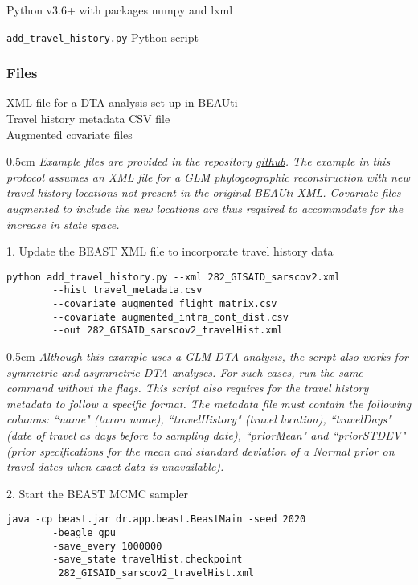 \documentclass{article}
\newcommand{\ann}[1]{
\begin{adjustwidth}{0.5cm}{}
\it{#1}\\
\end{adjustwidth}}
\newcommand{\code}[1]{
{\upshape\ttfamily{#1}}}
\begin{document}
\hspace{0.5cm}Python v3.6+ with packages numpy and lxml

\hspace{0.5cm}\verb|add_travel_history.py| Python script

\subsubsection*{Files}
XML file for a DTA analysis set up in BEAUti \\
Travel history metadata CSV file \\
Augmented covariate files \\

\ann{Example files are provided in the repository {\upshape\url{github}}. The example in this protocol assumes an XML file for a GLM phylogeographic reconstruction with new travel history locations not present in the original BEAUti XML. Covariate files augmented to include the new locations are thus required to accommodate for the increase in state space.}

1. Update the BEAST XML file to incorporate travel history data
\begin{verbatim}
python add_travel_history.py --xml 282_GISAID_sarscov2.xml
        --hist travel_metadata.csv
        --covariate augmented_flight_matrix.csv
        --covariate augmented_intra_cont_dist.csv
        --out 282_GISAID_sarscov2_travelHist.xml
\end{verbatim}

\ann{Although this example uses a GLM-DTA analysis, the\code{add\_travel\_history.py} script also works for symmetric and asymmetric DTA analyses. For such cases, run the same command without the\code{--covariate} flags. This script also requires for the travel history metadata to follow a specific format. The metadata file must contain the following columns: ``name"  (taxon name), ``travelHistory"  (travel location), ``travelDays"  (date of travel as days before to sampling date), ``priorMean"  and ``priorSTDEV"  (prior specifications for the mean and standard deviation of a Normal prior on travel dates when exact data is unavailable).}

2. Start the BEAST MCMC sampler
\begin{verbatim}
java -cp beast.jar dr.app.beast.BeastMain -seed 2020  
        -beagle_gpu
        -save_every 1000000
        -save_state travelHist.checkpoint
         282_GISAID_sarscov2_travelHist.xml
\end{verbatim}
\end{document}
